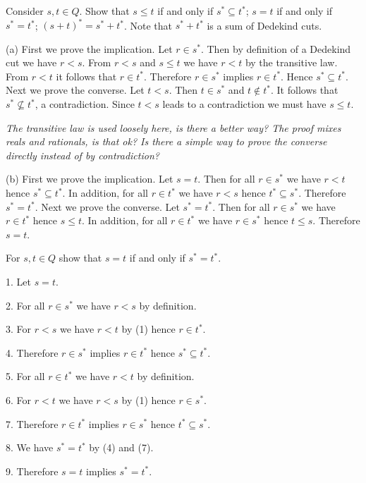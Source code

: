 

Consider $s,t\in Q$. Show that
\medskip
{} $s\le t$ if and only if $s^*\subseteq t^*$;
 $s=t$ if and only if $s^*=t^*$;
 $(s+t)^*=s^*+t^*$. Note that $s^*+t^*$ is a sum of Dedekind
cuts.

\bigskip
\noindent
(a)
First we prove the implication.
Let $r\in s^*$. Then by definition of a Dedekind cut we have $r<s$.
From $r<s$ and $s\le t$ we have $r<t$ by the transitive law.
From $r<t$ it follows that $r\in t^*$.
Therefore $r\in s^*$ implies $r\in t^*$. Hence $s^*\subseteq t^*$.
Next we prove the converse.
Let $t<s$. Then $t\in s^*$ and $t\not\in t^*$.
It follows that $s^*\not\subseteq t^*$, a contradiction.
Since $t<s$ leads to a contradiction we must have $s\le t$.

\bigskip
\noindent
{\it The transitive law is used loosely here, is there a better way?
The proof mixes reals and rationals, is that ok?
Is there a simple way to prove the converse directly instead of by
contradiction?}

\bigskip
\noindent
(b)
First we prove the implication.
Let $s=t$.
Then for all $r\in s^*$ we have $r<t$ hence $s^*\subseteq t^*$.
In addition, for all $r\in t^*$ we have $r<s$ hence $t^*\subseteq s^*$.
Therefore $s^*=t^*$.
Next we prove the converse.
Let $s^*=t^*$.
Then for all $r\in s^*$ we have $r\in t^*$ hence $s\le t$.
In addition, for all $r\in t^*$ we have $r\in s^*$ hence $t\le s$.
Therefore $s=t$.

\vfill
\eject

\noindent
For $s,t\in Q$ show that $s=t$ if and only if $s^*=t^*$.


\bigskip
\item{1.} Let $s=t$.

\item{2.} For all $r\in s^*$ we have $r<s$ by definition.
\item{3.} For $r<s$ we have $r<t$ by (1) hence $r\in t^*$.
\item{4.} Therefore $r\in s^*$ implies $r\in t^*$ hence $s^*\subseteq t^*$.

\item{5.} For all $r\in t^*$ we have $r<t$ by definition.
\item{6.} For $r<t$ we have $r<s$ by (1) hence $r\in s^*$.
\item{7.} Therefore $r\in t^*$ implies $r\in s^*$ hence $t^*\subseteq s^*$.

\item{8.} We have $s^*=t^*$ by (4) and (7).
\item{9.} Therefore $s=t$ implies $s^*=t^*$.

